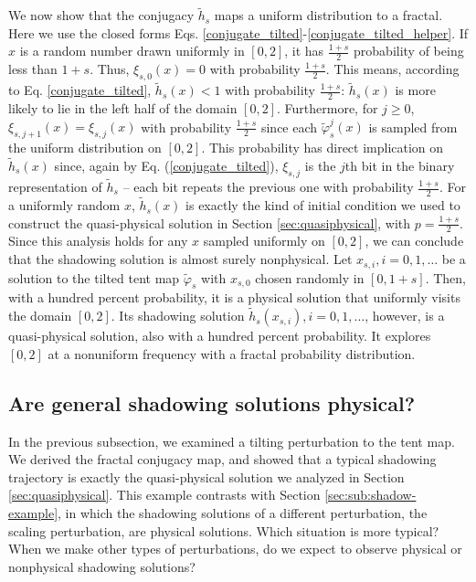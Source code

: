 We now show that the conjugacy $\tilde{h}_s$ maps a uniform
distribution to a fractal.  Here we use the closed forms Eqs. \ref{conjugate_tilted}-\ref{conjugate_tilted_helper}.
If $x$ is a random number drawn uniformly in $[0,2]$,
it has $\frac{1+s}2$ probability of being less than $1+s$.
Thus, $\xi_{s,0}(x)=0$ with probability $\frac{1+s}2$.
This means, according to Eq. \ref{conjugate_tilted},
$\tilde{h}_s(x)<1$ with probability $\frac{1+s}2$:
$\tilde{h}_s(x)$ is more likely to lie in the left half
of the domain $[0,2]$.
Furthermore, for $j\ge 0$, $\xi_{s,j+1}(x)=\xi_{s,j}(x)$
with probability $\frac{1+s}2$ since each $\tilde{\varphi}^j_s(x)$ is sampled
from the uniform distribution on $[0,2]$.  This probability has direct
implication on $\tilde{h}_s(x)$ since, again by Eq. (\ref{conjugate_tilted}),
$\xi_{s,j}$ is the $j$th bit in the binary representation of $\tilde{h}_s$ --
each bit repeats the previous one with probability
$\frac{1+s}2$.  For a uniformly random
$x$, $\tilde{h}_s(x)$ is exactly the kind of initial condition
we used to construct the quasi-physical solution
in Section \ref{sec:quasiphysical}, with $p=\frac{1+s}2$.
Since this analysis holds for any $x$ sampled uniformly on $[0,2]$, we can conclude that
the shadowing solution is almost surely nonphysical.  Let $x_{s,i},i=0,1,\ldots$ be a solution
to the tilted tent map $\tilde{\varphi}_s$ with $x_{s,0}$ chosen 
randomly in $[0,1+s]$.  Then, with a hundred percent probability,
it is a physical solution that uniformly visits the domain $[0,2]$.
Its shadowing solution $\tilde{h}_s(x_{s,i}),i=0,1,\ldots$, however,
is a quasi-physical solution, also with a hundred percent probability.
It explores $[0,2]$ at a nonuniform frequency with a fractal probability distribution.

\subsection{Are general shadowing solutions physical?}

In the previous subsection, we examined a tilting perturbation to the tent map.
We derived the fractal conjugacy map, and showed that a typical shadowing trajectory
is exactly the quasi-physical solution we analyzed in Section \ref{sec:quasiphysical}.
This example contrasts with Section \ref{sec:sub:shadow-example}, in which the
shadowing solutions of a different perturbation, the scaling perturbation,
are physical solutions.  Which situation is more typical?  When we make other
types of perturbations, do we expect to observe physical or nonphysical
shadowing solutions?



